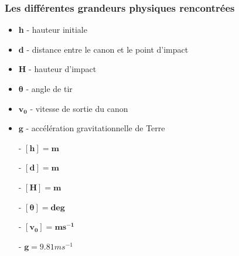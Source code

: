 \documentclass[12pt,a4paper]{article}
\begin{document}
    \subsubsection{Les différentes grandeurs physiques rencontrées}
    \begin{minipage}{0.6\linewidth}
        \begin{itemize}
            \item \textbf{h} - hauteur initiale 
            \item \textbf{d} - distance entre le canon et le point d'impact 
            \item \textbf{H} - hauteur d'impact
            \item $\bm{\theta}$ - angle de tir 
            \item $\bm{v_0}$ - vitesse de sortie du canon
            \item $\bm{g}$ - accélération gravitationnelle de Terre
        \end{itemize}
    \end{minipage}%
    \hfill
    \begin{minipage}{0.4\linewidth}
        \begin{itemize}
            \item[-] $\bm{[h]=m}$
            \item[-] $\bm{[d]=m}$
            \item[-] $\bm{[H]=m}$
            \item[-] $\bm{[\theta]=deg}$
            \item[-] $\bm{[v_0]=ms^{-1}}$
            \item[-] $\bm{g}=9.81ms^{-1}$
        \end{itemize}   
    \end{minipage}
\end{document}

